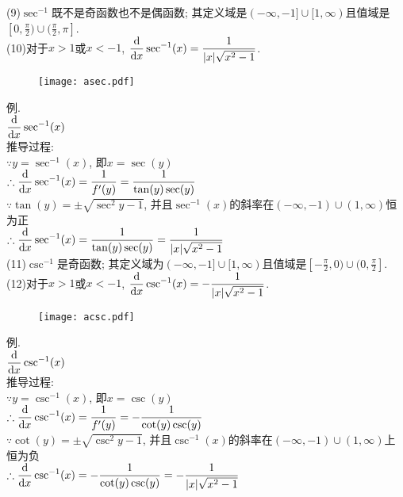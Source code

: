 (9)$\sec^{-1}$既不是奇函数也不是偶函数; 其定义域是$(-\infty,-1]\cup[1,\infty)$且值域是$\displaystyle[0,\frac{\pi}{2})\cup(\frac{\pi}{2},\pi]$.\\[1ex]
(10)对于$x>1$或$x<-1$, $\displaystyle\frac{\mathop{}\!\mathrm{d} }{\mathop{}\!\mathrm{d} x}\sec^{-1}(x)=\frac{1}{|x|\sqrt{x^2-1}}$.\\[1ex]
\begin{figure}[H]
\centering
	\texttt{[image: asec.pdf]}
\end{figure}
例.\\
\phantom{例}$\displaystyle\frac{\mathop{}\!\mathrm{d}}{\mathop{}\!\mathrm{d} x}\sec^{-1}(x)$\\
推导过程:\\
$\displaystyle\because y=\sec^{-1}(x)$, 即$x=\sec(y)$\\
$\displaystyle\therefore\frac{\mathop{}\!\mathrm{d}}{\mathop{}\!\mathrm{d} x}\sec^{-1}(x)=\frac{1}{f'(y)}=\frac{1}{\tan(y)\sec(y)}$\\
$\displaystyle\because\tan(y)=\pm\sqrt{\sec^2y-1}$, 并且$\sec^{-1}(x)$的斜率在$(-\infty,-1)\cup(1,\infty)$恒为正\\
$\displaystyle\therefore\frac{\mathop{}\!\mathrm{d}}{\mathop{}\!\mathrm{d} x}\sec^{-1}(x)=\frac{1}{\tan(y)\sec(y)}=\frac{1}{|x|\sqrt{x^2-1}}$\\[1ex]

(11)$\csc^{-1}$是奇函数; 其定义域为$(-\infty,-1]\cup[1,\infty)$且值域是$\displaystyle[-\frac{\pi}{2},0)\cup(0,\frac{\pi}{2}]$.\\[1ex]
(12)对于$x>1$或$x<-1$, $\displaystyle\frac{\mathop{}\!\mathrm{d} }{\mathop{}\!\mathrm{d} x}\csc^{-1}(x)=-\frac{1}{|x|\sqrt{x^2-1}}$.\\[2ex]
\begin{figure}[H]
\centering
	\texttt{[image: acsc.pdf]}
\end{figure}
例.\\
\phantom{例}$\displaystyle\frac{\mathop{}\!\mathrm{d}}{\mathop{}\!\mathrm{d} x}\csc^{-1}(x)$\\
推导过程:\\
$\displaystyle\because y=\csc^{-1}(x)$, 即$x=\csc(y)$\\
$\displaystyle\therefore\frac{\mathop{}\!\mathrm{d}}{\mathop{}\!\mathrm{d} x}\csc^{-1}(x)=\frac{1}{f'(y)}=-\frac{1}{\cot(y)\csc(y)}$\\
$\displaystyle\because\cot(y)=\pm\sqrt{\csc^2y-1}$, 并且$\csc^{-1}(x)$的斜率在$(-\infty,-1)\cup(1,\infty)$上恒为负\\
$\displaystyle\therefore\frac{\mathop{}\!\mathrm{d}}{\mathop{}\!\mathrm{d} x}\csc^{-1}(x)=-\frac{1}{\cot(y)\csc(y)}=-\frac{1}{|x|\sqrt{x^2-1}}$\\[2ex]

